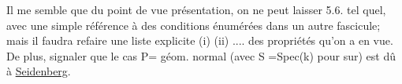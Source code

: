 Il me semble que du point de vue présentation, on ne peut laisser
5.6. tel quel, avec une simple référence à des conditions énumérées dans
un autre fascicule; mais il faudra refaire une liste explicite (i) (ii)
.... des propriétés qu'on a en vue. De plus, signaler  que le cas P= géom.
normal (avec S =Spec(k) pour sur) est dû à \uline{Seidenberg}.

